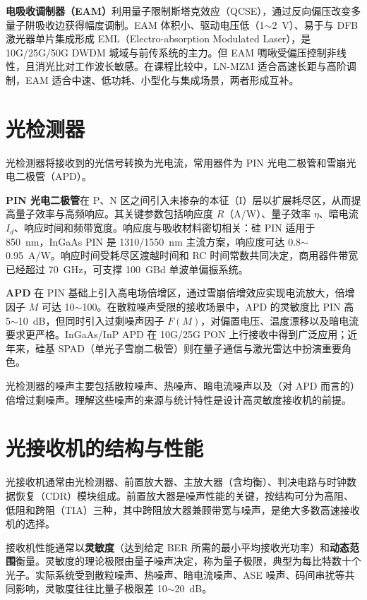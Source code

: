 \documentclass[a4paper,11pt,UTF8,fontset=fandol]{ctexart}
\begin{document}
\textbf{电吸收调制器（EAM）}利用量子限制斯塔克效应（QCSE），通过反向偏压改变多量子阱吸收边获得幅度调制。EAM 体积小、驱动电压低（1$\sim$2~V）、易于与 DFB 激光器单片集成形成 EML（Electro-absorption Modulated Laser），是 10G/25G/50G DWDM 城域与前传系统的主力。但 EAM 啁啾受偏压控制非线性，且消光比对工作波长敏感。在课程比较中，LN-MZM 适合高速长距与高阶调制，EAM 适合中速、低功耗、小型化与集成场景，两者形成互补。

\section{光检测器}

光检测器将接收到的光信号转换为光电流，常用器件为 PIN 光电二极管和雪崩光电二极管（APD）\cite{yuanrong2020}。

\textbf{PIN 光电二极管}在 P、N 区之间引入未掺杂的本征（I）层以扩展耗尽区，从而提高量子效率与高频响应。其关键参数包括响应度 $R$（A/W）、量子效率 $\eta$、暗电流 $I_d$、响应时间和频带宽度。响应度与吸收材料密切相关：硅 PIN 适用于 850~nm，InGaAs PIN 是 1310/1550~nm 主流方案，响应度可达 0.8$\sim$0.95~A/W。响应时间受耗尽区渡越时间和 RC 时间常数共同决定，商用器件带宽已经超过 70~GHz，可支撑 100~GBd 单波单偏振系统。

\textbf{APD} 在 PIN 基础上引入高电场倍增区，通过雪崩倍增效应实现电流放大，倍增因子 $M$ 可达 10$\sim$100。在散粒噪声受限的接收场景中，APD 的灵敏度比 PIN 高 5$\sim$10~dB，但同时引入过剩噪声因子 $F(M)$，对偏置电压、温度漂移以及暗电流要求更严格。InGaAs/InP APD 在 10G/25G PON 上行接收中得到广泛应用；近年来，硅基 SPAD（单光子雪崩二极管）则在量子通信与激光雷达中扮演重要角色。

光检测器的噪声主要包括散粒噪声、热噪声、暗电流噪声以及（对 APD 而言的）倍增过剩噪声。理解这些噪声的来源与统计特性是设计高灵敏度接收机的前提。

\section{光接收机的结构与性能}

光接收机通常由光检测器、前置放大器、主放大器（含均衡）、判决电路与时钟数据恢复（CDR）模块组成\cite{yuanrong2020}。前置放大器是噪声性能的关键，按结构可分为高阻、低阻和跨阻（TIA）三种，其中跨阻放大器兼顾带宽与噪声，是绝大多数高速接收机的选择。

接收机性能通常以\textbf{灵敏度}（达到给定 BER 所需的最小平均接收光功率）和\textbf{动态范围}衡量。灵敏度的理论极限由量子噪声决定，称为量子极限，典型为每比特数十个光子。实际系统受到散粒噪声、热噪声、暗电流噪声、ASE 噪声、码间串扰等共同影响，灵敏度往往比量子极限差 10$\sim$20~dB。
\end{document}
